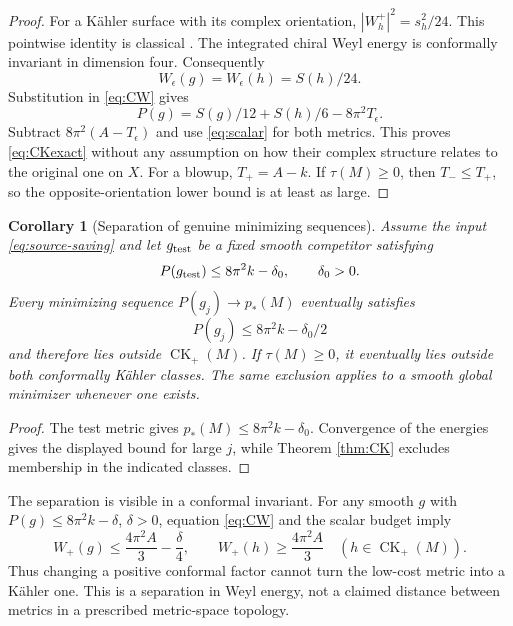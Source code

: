 \documentclass[11pt,a4paper]{article}
\numberwithin{equation}{section}
\newtheorem{corollary}[theorem]{Corollary}
\theoremstyle{definition}\newtheorem{hypothesis}[theorem]{Input}
\theoremstyle{remark}\newtheorem{remark}[theorem]{Remark}
\newcommand{\CK}{\operatorname{CK}}
\begin{document}
\begin{proof}
For a K\"ahler surface with its complex orientation,
$|W^+_h|^2=s_h^2/24$.  This pointwise identity is classical
\cite[Introduction]{LeBrun}.  The integrated chiral Weyl energy is
conformally invariant in dimension four.  Consequently
\[
 W_\epsilon(g)=W_\epsilon(h)=S(h)/24.
\]
Substitution in \eqref{eq:CW} gives
\[
 P(g)=S(g)/12+S(h)/6-8\pi^2T_\epsilon.
\]
Subtract $8\pi^2(A-T_\epsilon)$ and use \eqref{eq:scalar} for both metrics.
This proves \eqref{eq:CKexact} without any assumption on how their complex
structure relates to the original one on $X$.
For a blowup, $T_+=A-k$.  If $\tau(M)\ge0$, then $T_-\le T_+$, so the
opposite-orientation lower bound is at least as large.
\end{proof}

\begin{corollary}[Separation of genuine minimizing sequences]\label{cor:separation}
Assume the input \eqref{eq:source-saving} and let $g_{\rm test}$ be a fixed
smooth competitor satisfying
\[
 P(g_{\rm test})\le8\pi^2k-\delta_0,\qquad \delta_0>0.
\]
Every minimizing sequence $P(g_j)\to p_*(M)$ eventually satisfies
\begin{equation}
 P(g_j)\le8\pi^2k-\delta_0/2
\end{equation}
and therefore lies outside $\CK_+(M)$.  If $\tau(M)\ge0$, it eventually
lies outside both conformally K\"ahler classes.  The same exclusion applies
to a smooth global minimizer whenever one exists.
\end{corollary}

\begin{proof}
The test metric gives $p_*(M)\le8\pi^2k-\delta_0$.  Convergence of the
energies gives the displayed bound for large $j$, while Theorem
\ref{thm:CK} excludes membership in the indicated classes.
\end{proof}

The separation is visible in a conformal invariant.  For any smooth $g$
with $P(g)\le8\pi^2k-\delta$, $\delta>0$, equation \eqref{eq:CW} and the
scalar budget imply
\begin{equation}\label{eq:Weylseparation}
 \boxed{W_+(g)\le\frac{4\pi^2A}{3}-\frac\delta4,
 \qquad W_+(h)\ge\frac{4\pi^2A}{3}\quad(h\in\CK_+(M)).}
\end{equation}
Thus changing a positive conformal factor cannot turn the low-cost metric
into a K\"ahler one.  This is a separation in Weyl energy, not a claimed
distance between metrics in a prescribed metric-space topology.
\end{document}
